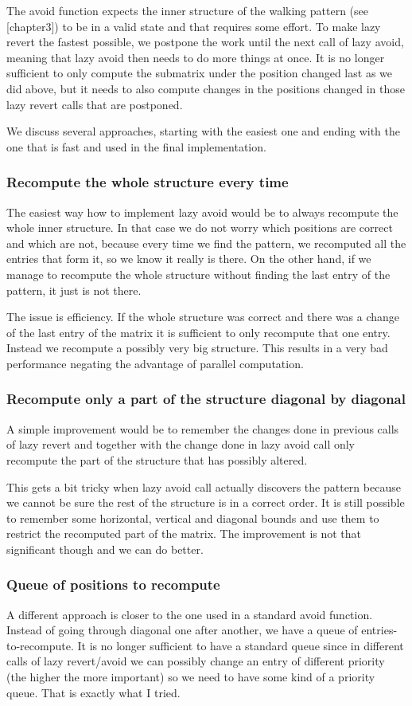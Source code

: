 The avoid function expects the inner structure of the walking pattern (see [chapter3]) to be in a valid state and that requires some effort. To make lazy revert the fastest possible, we postpone the work until the next call of lazy avoid, meaning that lazy avoid then needs to do more things at once. It is no longer sufficient to only compute the submatrix under the position changed last as we did above, but it needs to also compute changes in the positions changed in those lazy revert calls that are postponed.

We discuss several approaches, starting with the easiest one and ending with the one that is fast and used in the final implementation.

\subsubsection{Recompute the whole structure every time}
The easiest way how to implement lazy avoid would be to always recompute the whole inner structure. In that case we do not worry which positions are correct and which are not, because every time we find the pattern, we recomputed all the entries that form it, so we know it really is there. On the other hand, if we manage to recompute the whole structure without finding the last entry of the pattern, it just is not there.

The issue is efficiency. If the whole structure was correct and there was a change of the last entry of the matrix it is sufficient to only recompute that one entry. Instead we recompute a possibly very big structure. This results in a very bad performance negating the advantage of parallel computation.
\subsubsection{Recompute only a part of the structure diagonal by diagonal}
A simple improvement would be to remember the changes done in previous calls of lazy revert and together with the change done in lazy avoid call only recompute the part of the structure that has possibly altered.

This gets a bit tricky when lazy avoid call actually discovers the pattern because we cannot be sure the rest of the structure is in a correct order. It is still possible to remember some horizontal, vertical and diagonal bounds and use them to restrict the recomputed part of the matrix. The improvement is not that significant though and we can do better.
\subsubsection{Queue of positions to recompute}
A different approach is closer to the one used in a standard avoid function. Instead of going through diagonal one after another, we have a queue of entries-to-recompute. It is no longer sufficient to have a standard queue since in different calls of lazy revert/avoid we can possibly change an entry of different priority (the higher the more important) so we need to have some kind of a priority queue. That is exactly what I tried.

